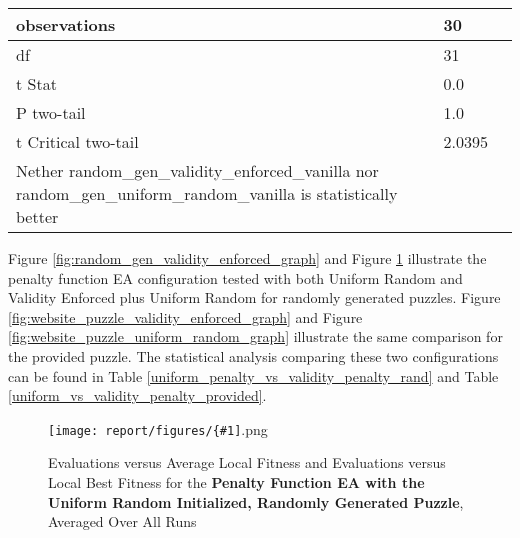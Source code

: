 \documentclass[11pt]{article}
\newcommand{\fitnessplotcaption}[1]{\caption{Evaluations versus Average Local Fitness and Evaluations versus 
    Local Best Fitness for the \textbf{{#1}}, Averaged Over All Runs}}
\newcommand{\addgraphic}[1]{\centerline{\texttt{[image: report/figures/\{\#1]}.png}}}
\begin{document}
\begin{table}[H]
{\begin{tabular}{|l|l|l|}
    observations                                                                                                      & 30                                    &                                          \\ \hline
    df                                                                                                                & 31                                    &                                          \\ \hline
    t Stat                                                                                                            & 0.0                                   &                                          \\ \hline
    P two-tail                                                                                                        & 1.0                                   &                                          \\ \hline
    t Critical two-tail                                                                                               & 2.0395                                &                                          \\ \hline
    Nether random\_gen\_validity\_enforced\_vanilla nor random\_gen\_uniform\_random\_vanilla is statistically better &                                       &                                          \\ \hline
    \end{tabular}%
    }
\end{table}


Figure \ref{fig:random_gen_validity_enforced_graph} and Figure \ref{fig:random_gen_uniform_random_graph} 
illustrate the penalty function EA configuration tested with both Uniform Random and 
Validity Enforced plus Uniform Random for randomly generated puzzles. Figure \ref{fig:website_puzzle_validity_enforced_graph} 
and Figure \ref{fig:website_puzzle_uniform_random_graph} illustrate
the same comparison for the provided puzzle. The statistical analysis comparing these two 
configurations can be found in Table \ref{uniform_penalty_vs_validity_penalty_rand} and Table \ref{uniform_vs_validity_penalty_provided}.

\begin{figure}[H]
    \addgraphic{random_gen_uniform_random_graph}
    \fitnessplotcaption{Penalty Function EA with the Uniform Random Initialized, Randomly Generated Puzzle}
    \label{fig:random_gen_uniform_random_graph}
\end{figure}
\end{document}
